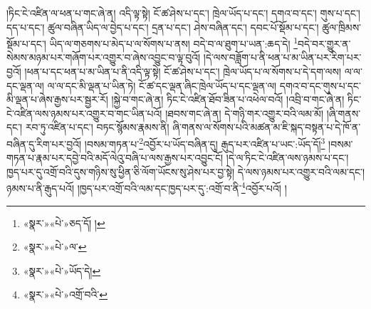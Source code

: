 །ཏིང་ངེ་འཛིན་ལ་ཕན་པ་གང་ཞེ་ན། འདི་ལྟ་སྟེ། ངོ་ཚ་ཤེས་པ་དང་། ཁྲེལ་ཡོད་པ་དང་། དགའ་བ་དང་། གུས་པ་དང་། དད་པ་དང་། ཚུལ་བཞིན་ཡིད་ལ་བྱེད་པ་དང་། དྲན་པ་དང་། ཤེས་བཞིན་དང་། དབང་པོ་སྡོམ་པ་དང་། ཚུལ་ཁྲིམས་སྡོམ་པ་དང་། ཡིད་ལ་གཅགས་པ་མེད་པ་ལ་སོགས་པ་ནས། བདེ་བ་ལ་ཐུག་པ་ཡན་:ཆད་དེ། \footnote{«སྣར་»«པེ་»ཅད་དོ། ། }བདེ་བར་གྱུར་ན་སེམས་མཉམ་པར་གཞོག་པར་འགྱུར་བ་ཞེས་འབྱུང་བ་ལྟ་བུའོ། །དེ་ལས་བཟློག་པ་ནི་ཕན་པ་མ་ཡིན་པར་རིག་པར་བྱའོ། །ཕན་པ་དང་ཕན་པ་མ་ཡིན་པ་ནི་འདི་ལྟ་སྟེ། ངོ་ཚ་ཤེས་པ་དང་། ཁྲེལ་ཡོད་པ་ལ་སོགས་པ་དེ་དག་ལས། ལ་ལ་དང་ལྡན་ལ། ལ་ལ་དང་མི་ལྡན་པ་ཡིན་ཏེ། ངོ་ཚ་དང་ལྡན་ཞིང་ཁྲེལ་ཡོད་པ་དང་ལྡན་ལ། དགའ་བ་དང་གུས་པ་དང་མི་ལྡན་པ་ཞེས་རྒྱས་པར་སྦྱར་རོ། །སྐྱེ་བ་གང་ཞེ་ན། ཏིང་ངེ་འཛིན་ཐོབ་ཟིན་པ་འཕེལ་བའོ། །འབྲི་བ་གང་ཞེ་ན། ཏིང་ངེ་འཛིན་ལས་ཉམས་པར་འགྱུར་བ་གང་ཡིན་པའོ། །ཐབས་གང་ཞེ་ན། དེ་གཉི་གར་འགྱུར་བའི་ལམ་མོ། །ཞི་གནས་དང་། རབ་ཏུ་འཛིན་པ་དང་། བཏང་སྙོམས་རྣམས་ནི། ཞི་གནས་ལ་སོགས་པའི་མཚན་མ་ཇི་སྐད་བསྟན་པ་དེ་ཁོ་ན་བཞིན་དུ་རིག་པར་བྱའོ། །བསམ་གཏན་པ་\footnote{«སྣར་»«པེ་»ལ་}འབྱོར་པ་ཡོད་བཞིན་དུ། རྒུད་པར་འཛིན་པ་ཡང་:ཡོད་དོ།\footnote{«སྣར་»«པེ་»ཡོད་དེ།} །བསམ་གཏན་པ་རྣམ་པར་དབྱེ་བའི་མདོ་ལེའུ་བཞི་པ་ལས་རྒྱས་པར་འབྱུང་ངོ། །དེ་ལ་ཏིང་ངེ་འཛིན་ལས་ཉམས་པ་དང་། ཁྱད་པར་དུ་འགྲོ་བའི་དུས་གཉིས་སུ་ཕྱིན་ཅི་ལོག་ཡོངས་སུ་ཤེས་པར་བྱ་སྟེ། དེ་ལས་ཉམས་པར་འགྱུར་བའི་ལམ་དང་། ཉམས་པ་ནི་རྒུད་པའོ། །ཁྱད་པར་འགྲོ་བའི་ལམ་དང་ཁྱད་པར་དུ་:འགྲོ་བ་ནི་\footnote{«སྣར་»«པེ་»འགྲོ་བའི་}འབྱོར་པའོ། །
